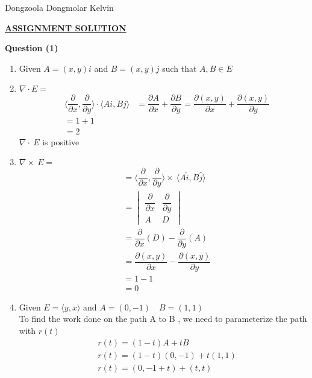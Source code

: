 \documentclass[12pt,a4paper]{article}
\begin{document}
\begin{center}
	Dongzoola Dongmolar Kelvin\\
\end{center}
\begin{center}
\underline{\textbf{ASSIGNMENT SOLUTION}}
\end{center}\vspace{5mm}
\textbf{Question (1)}\\
\begin{enumerate}
\item Given $A = (x,y)i$ and $B = (x,y) 
j$ such that $A , B \in E$

	\item $\nabla \cdot  E =$
	\begin{align*}
	&\langle \dfrac{\partial}{\partial x} , \dfrac{\partial}{\partial y} \rangle \cdot  \langle
	Ai, Bj \rangle
	& = \dfrac{\partial A}{\partial x} + \dfrac{\partial B}{\partial y} =
	\dfrac{\partial (x,y)}{\partial x} + \dfrac{\partial (x,y)}{\partial y} \\
	&= 1 + 1 \\
	&= 2
	\end{align*}
	$\nabla \cdot ~ E $ is positive
	\item $\nabla \times ~ E =$
	\begin{align*}
	&= \langle \dfrac{\partial}{\partial x} , \dfrac{\partial}{\partial y} \rangle \times ~ \langle
	A\hat{i}, B\hat{j} \rangle \\
	&=\begin{vmatrix}
	\dfrac{\partial}{\partial x} & \dfrac{\partial}{\partial y} \\
	A & D
	\end{vmatrix} \\
	&=\dfrac{\partial}{\partial x} (D) - \dfrac{\partial}{\partial y} (A)\\
	&=\dfrac{\partial (x,y)}{\partial x} - \dfrac{\partial (x,y)}{\partial y} \\
	& = 1 - 1 \\
	&= 0
	\end{align*}
	\item Given $E = \langle y , x \rangle$ and $A = (0 , -1) \quad B = (1 , 1 )$
	\\ To find the work done on the path A to B , we need to parameterize the path with $r(t)$
	\begin{align*}
	&r(t) = ( 1- t) A + t B \\
	& r(t) = (1-t) (0 , -1) + t (1, 1) \\
	& r(t) = (0 , -1 + t) + ( t , t) \\

\end{align*}
\end{enumerate}
\end{document}
